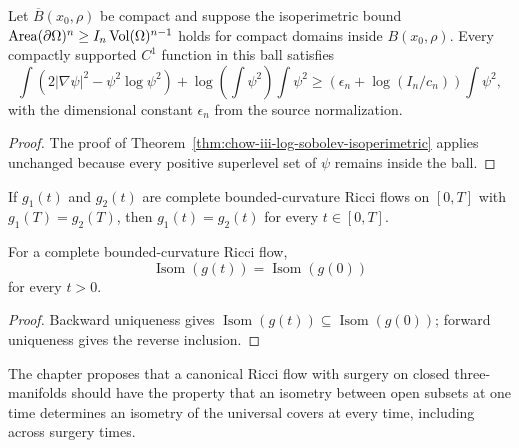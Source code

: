 \begin{theorem}
\label{thm:chow-iii-local-log-sobolev}
Let \(\overline B(x_0,\rho)\) be compact and suppose the isoperimetric bound
\(\operatorname{Area}(\partial\Omega)^n\ge I_n\operatorname{Vol}(\Omega)^{n-1}\) holds for compact domains
inside \(B(x_0,\rho)\).  Every compactly supported \(C^1\) function in this ball
satisfies
\[
 \int(2|\nabla\psi|^2-\psi^2\log\psi^2)
 +\log\!\left(\int\psi^2\right)\int\psi^2
 \ge\left(\epsilon_n+\log(I_n/c_n)\right)\int\psi^2,
\]
with the dimensional constant \(\epsilon_n\) from the source normalization.
\end{theorem}
\begin{proof}
The proof of Theorem~\ref{thm:chow-iii-log-sobolev-isoperimetric} applies
unchanged because every positive superlevel set of \(\psi\) remains inside
the ball.
\end{proof}

\begin{theorem}
\label{thm:chow-iii-backward-uniqueness}
If \(g_1(t)\) and \(g_2(t)\) are complete bounded-curvature Ricci flows on
\([0,T]\) with \(g_1(T)=g_2(T)\), then \(g_1(t)=g_2(t)\) for every
\(t\in[0,T]\).
\end{theorem}

\begin{corollary}
\label{cor:chow-iii-isometry-group-preserved}
For a complete bounded-curvature Ricci flow,
\[
 \operatorname{Isom}(g(t))=\operatorname{Isom}(g(0))
\]
for every \(t>0\).
\end{corollary}
\begin{proof}
Backward uniqueness gives \(\operatorname{Isom}(g(t))\subseteq\operatorname{Isom}(g(0))\);
forward uniqueness gives the reverse inclusion.
\end{proof}

\begin{remark}
\label{rem:chow-iii-canonical-surgery-criterion}
The chapter proposes that a canonical Ricci flow with surgery on closed
three-manifolds should have the property that an isometry between open subsets
at one time determines an isometry of the universal covers at every time,
including across surgery times.
\end{remark}
